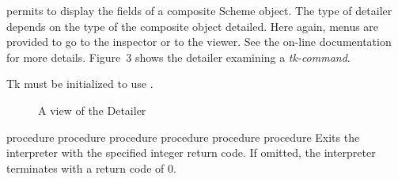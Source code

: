 \begin{entry}{%
}
\saut %
 permits to display the fields of a composite Scheme
object.  The type of detailer depends on the type of the composite
object detailed. Here again, menus are provided to go to the inspector
or to the viewer. See the on-line documentation for more details.
Figure~3 shows the detailer examining a {\em tk-command}.

\begin{note}
Tk must be initialized to use .
\end{note}

\begin{figure}
\centerline{}
\caption{A view of the Detailer}
\end{figure}
\end{entry}

\begin{entry}{%
 {procedure}
 {procedure}
 {procedure}
 {procedure}
 {procedure}
 {procedure}}
\saut
Exits the {\stk} interpreter with the specified integer return code. If
omitted, the interpreter terminates with a return code of 0.
\end{entry}


